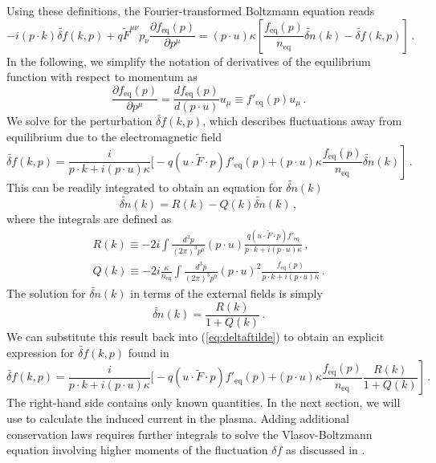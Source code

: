 Using these definitions, the Fourier-transformed Boltzmann equation reads \cite{Formanek:2021blc}
\begin{equation}\label{eq:boltzfourier}
-i (p \cdot k) \widetilde{\delta f}(k,p) + q\widetilde{F}^{\mu\nu}p_\nu \frac{\partial f_\mathrm{eq}(p)}{\partial p^\mu} 
= (p \cdot u)\kappa \left[\frac{f_\mathrm{eq}(p)}{n_\mathrm{eq}}\widetilde{\delta n}(k) - \widetilde{\delta f}(k,p) \right]\,.
\end{equation}
In the following, we simplify the notation of derivatives of the equilibrium function with respect to momentum as
\begin{equation}
\frac{\partial f_\mathrm{eq}(p)}{\partial p^\mu} = \frac{d f_\mathrm{eq}(p)}{d (p \cdot u)} u_\mu \equiv f'_\mathrm{eq}(p) u_\mu \,.
\end{equation}
We solve  for the perturbation $\widetilde{\delta f}(k,p)$, which describes fluctuations away from equilibrium due to the electromagnetic field
\begin{equation}\label{eq:deltaftilde}
\widetilde{\delta f}(k,p) = \frac{i}{p \cdot k + i (p \cdot u) \kappa}\bigg[-q (u \cdot \widetilde{F} \cdot p)f'_\mathrm{eq}(p) 
\left.+ (p \cdot u) \kappa \frac{f_\mathrm{eq}(p)}{n_\mathrm{eq}}\widetilde{\delta n}(k)\right]\,.
\end{equation}
This can be readily integrated to obtain an equation for $\widetilde{\delta n}(k)$
\begin{equation}
\widetilde{\delta n}(k) = R(k) - Q(k)\widetilde{\delta n}(k)\,,
\end{equation}
where the integrals are defined as
\begin{align}\label{eq:R}
R(k)  \equiv -2i \int \frac{d^3p}{(2\pi)^3p^0}(p \cdot u) \frac{q(u \cdot \widetilde{F} \cdot p)f'_\mathrm{eq}}{p \cdot k + i (p \cdot u)\kappa}\,,\\
\label{eq:Q}Q(k) \equiv -2i \frac{\kappa}{n_\mathrm{eq}}\int \frac{d^3p}{(2\pi)^3p^0}(p \cdot u)^2 \frac{f_\mathrm{eq}(p)}{p\cdot k + i(p \cdot u)\kappa}\,.
\end{align}
The solution for $\widetilde{\delta n}(k)$ in terms of the external fields is simply 
\begin{equation}
\widetilde{\delta n}(k) = \frac{R(k)}{1+Q(k)}\,.
\end{equation}
We can substitute this result back into (\ref{eq:deltaftilde}) to obtain an explicit expression for $\widetilde{\delta f}(k,p)$ found in \cite{Formanek:2021blc}
\begin{equation}\label{eq:deltafsolution}
	\widetilde{\delta f}(k,p) = \frac{i}{p \cdot k + i (p \cdot u) \kappa}\bigg[-q (u \cdot \widetilde{F} \cdot p)f'_\mathrm{eq}(p) 
	\left.+ (p \cdot u) \kappa \frac{f_\mathrm{eq}(p)}{n_\mathrm{eq}} \frac{R(k)}{1+Q(k)}\right]\,.
\end{equation}
The right-hand side contains only known quantities. In the next section, we will use  to calculate the induced current in the plasma. Adding additional conservation laws requires further integrals to solve the Vlasov-Boltzmann equation involving higher moments of the fluctuation $\delta f$ as discussed in \cite{Rocha:2021zcw,Singha:2023eia}.

